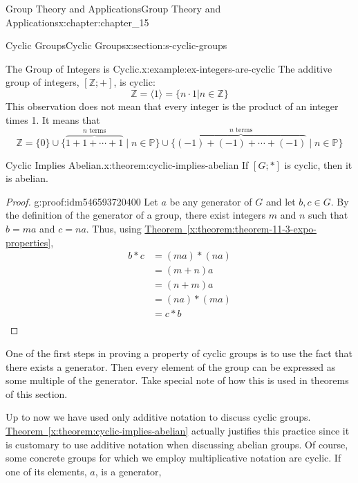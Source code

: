 \documentclass[oneside,10pt,]{book}
\newcommand{\xreffont}{\relax}
\numberwithin{equation}{section}
\begin{document}
\begin{chapterptx}{Group Theory and Applications}{}{Group Theory and Applications}{}{}{x:chapter:chapter_15}
\begin{sectionptx}{Cyclic Groups}{}{Cyclic Groups}{}{}{x:section:s-cyclic-groups}
\begin{example}{The Group of Integers is Cyclic.}{x:example:ex-integers-are-cyclic}
The additive group of integers, \([\mathbb{Z}; +]\), is cyclic:%
\begin{equation*}
\mathbb{Z} = \langle 1 \rangle = \{n\cdot 1 |n \in  \mathbb{Z}\}
\end{equation*}
This observation does not mean that every integer is the product of an integer times 1. It means that%
\begin{equation*}
\mathbb{Z} = \{0\}
\cup \{\overbrace{1+1+\cdots +1}^{n \textrm{ terms}} \mid  n \in \mathbb{P} \}
\cup \{\overbrace{(-1)+(-1)+\cdots +(-1)}^{n \textrm{ terms}} \mid n \in \mathbb{P}\}
\end{equation*}
%
\end{example}
\begin{theorem}{Cyclic Implies Abelian.}{}{x:theorem:cyclic-implies-abelian}%
If \([G;*]\) is cyclic, then it is abelian.%
\end{theorem}
\begin{proof}{}{g:proof:idm546593720400}
Let \(a\) be any generator of \(G\) and let \(b, c \in  G\). By the definition of the generator of a group, there exist integers \(m\) and \(n\) such that \(b = m a\) and \(c = n a\). Thus, using  \hyperref[x:theorem:theorem-11-3-expo-properties]{Theorem~{\xreffont\ref{x:theorem:theorem-11-3-expo-properties}}},%
\begin{equation*}
\begin{split}
b*c &= (m a)*(n a)\\
&= (m + n)a \\
&= (n + m)a \\
&= (n a)*(m a)\\
&=  c*b\\
\end{split}
\end{equation*}
%
\par
%
\end{proof}
One of the first steps in proving a property of cyclic groups is to use the fact that there exists a generator. Then every element of the group can be expressed as some multiple of the generator. Take special note of how this is used in theorems of this section.%
\par
Up to now we have used only additive notation to discuss cyclic groups. \hyperref[x:theorem:cyclic-implies-abelian]{Theorem~{\xreffont\ref{x:theorem:cyclic-implies-abelian}}} actually justifies this practice since it is customary to use additive notation when discussing abelian groups. Of course, some concrete groups for which we employ multiplicative notation are cyclic. If one of its elements, \(a\), is a generator,%

\end{sectionptx}
\end{chapterptx}
\end{document}
